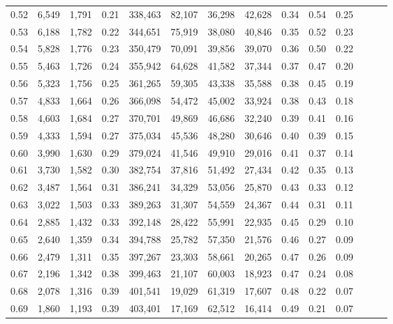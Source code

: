 \begin{tabular}{rrrrrrrrrrrrrr}
0.52 &   6,549 &  1,791 &  0.21 &  338,463 &   82,107 &  36,298 &  42,628 &  0.34 &  0.54 &      0.25 \\
0.53 &   6,188 &  1,782 &  0.22 &  344,651 &   75,919 &  38,080 &  40,846 &  0.35 &  0.52 &      0.23 \\
0.54 &   5,828 &  1,776 &  0.23 &  350,479 &   70,091 &  39,856 &  39,070 &  0.36 &  0.50 &      0.22 \\
0.55 &   5,463 &  1,726 &  0.24 &  355,942 &   64,628 &  41,582 &  37,344 &  0.37 &  0.47 &      0.20 \\
0.56 &   5,323 &  1,756 &  0.25 &  361,265 &   59,305 &  43,338 &  35,588 &  0.38 &  0.45 &      0.19 \\
0.57 &   4,833 &  1,664 &  0.26 &  366,098 &   54,472 &  45,002 &  33,924 &  0.38 &  0.43 &      0.18 \\
0.58 &   4,603 &  1,684 &  0.27 &  370,701 &   49,869 &  46,686 &  32,240 &  0.39 &  0.41 &      0.16 \\
0.59 &   4,333 &  1,594 &  0.27 &  375,034 &   45,536 &  48,280 &  30,646 &  0.40 &  0.39 &      0.15 \\
0.60 &   3,990 &  1,630 &  0.29 &  379,024 &   41,546 &  49,910 &  29,016 &  0.41 &  0.37 &      0.14 \\
0.61 &   3,730 &  1,582 &  0.30 &  382,754 &   37,816 &  51,492 &  27,434 &  0.42 &  0.35 &      0.13 \\
0.62 &   3,487 &  1,564 &  0.31 &  386,241 &   34,329 &  53,056 &  25,870 &  0.43 &  0.33 &      0.12 \\
0.63 &   3,022 &  1,503 &  0.33 &  389,263 &   31,307 &  54,559 &  24,367 &  0.44 &  0.31 &      0.11 \\
0.64 &   2,885 &  1,432 &  0.33 &  392,148 &   28,422 &  55,991 &  22,935 &  0.45 &  0.29 &      0.10 \\
0.65 &   2,640 &  1,359 &  0.34 &  394,788 &   25,782 &  57,350 &  21,576 &  0.46 &  0.27 &      0.09 \\
0.66 &   2,479 &  1,311 &  0.35 &  397,267 &   23,303 &  58,661 &  20,265 &  0.47 &  0.26 &      0.09 \\
0.67 &   2,196 &  1,342 &  0.38 &  399,463 &   21,107 &  60,003 &  18,923 &  0.47 &  0.24 &      0.08 \\
0.68 &   2,078 &  1,316 &  0.39 &  401,541 &   19,029 &  61,319 &  17,607 &  0.48 &  0.22 &      0.07 \\
0.69 &   1,860 &  1,193 &  0.39 &  403,401 &   17,169 &  62,512 &  16,414 &  0.49 &  0.21 &      0.07 \\

\end{tabular}
